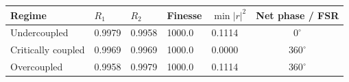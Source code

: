 \begin{tabular}{@{}lllllc@{}}
\toprule
Regime & $R_1$ & $R_2$ & Finesse & $\min|r|^2$ & Net phase / FSR \\
\midrule
Undercoupled & 0.9979 & 0.9958 & 1000.0 & 0.1114 & $0^\circ$ \\
Critically coupled & 0.9969 & 0.9969 & 1000.0 & 0.0000 & $360^\circ$ \\
Overcoupled & 0.9958 & 0.9979 & 1000.0 & 0.1114 & $360^\circ$ \\
\bottomrule
\end{tabular}
